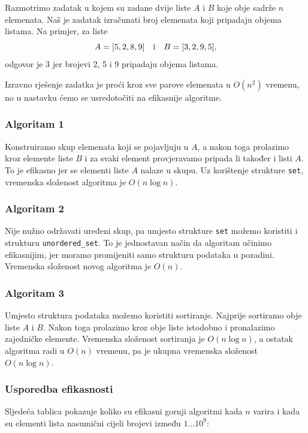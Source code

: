Razmotrimo zadatak u kojem su
zadane dvije liste $A$ i $B$
koje obje sadrže $n$ elemenata.
Naš je zadatak izračunati broj elemenata
koji pripadaju objema listama.
Na primjer, za liste
\[A = [5,2,8,9] \hspace{10px} \textrm{i} \hspace{10px} B = [3,2,9,5],\]
odgovor je 3 jer brojevi 2, 5
i 9 pripadaju objema listama.

Izravno rješenje zadatka je
proći kroz sve parove elemenata u $O(n^2)$ vremenu,
no u nastavku ćemo se usredotočiti na
efikasnije algoritme.

\subsubsection{Algoritam 1}

Konstruiramo skup elemenata koji se pojavljuju u $A$,
a nakon toga prolazimo kroz elemente
liste $B$ i za svaki element provjeravamo pripada li
također i listi $A$.
To je efikasno jer se elementi liste $A$
nalaze u skupu.
Uz korištenje strukture \texttt{set},
vremenska složenost algoritma je $O(n \log n)$.

\subsubsection{Algoritam 2}

Nije nužno održavati uređeni skup,
pa umjesto strukture \texttt{set}
možemo koristiti i strukturu \texttt{unordered\_set}.
To je jednostavan način da algoritam učinimo
efikasnijim, jer moramo promijeniti samo
strukturu podataka u pozadini.
Vremenska složenost novog algoritma je $O(n)$.

\subsubsection{Algoritam 3}

Umjesto struktura podataka možemo koristiti sortiranje.
Najprije sortiramo obje liste $A$ i $B$.
Nakon toga prolazimo kroz obje liste
istodobno i pronalazimo zajedničke elemente.
Vremenska složenost sortiranja je $O(n \log n)$,
a ostatak algoritma radi u $O(n)$ vremenu,
pa je ukupna vremenska složenost $O(n \log n)$.

\subsubsection{Usporedba efikasnosti}

Sljedeća tablica pokazuje koliko su efikasni
gornji algoritmi kada $n$ varira i
kada su elementi lista nasumični
cijeli brojevi između $1 \ldots 10^9$:

